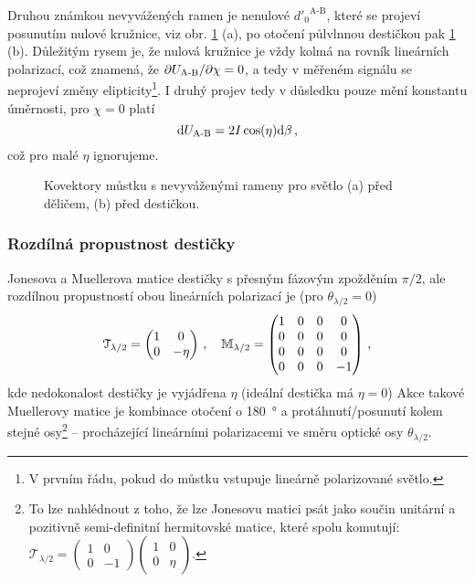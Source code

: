 Druhou známkou nevyvážených ramen je nenulové  ${d'_0}^\textrm{A-B}$, které se projeví posunutím nulové kružnice, viz obr. \ref{fig:mustek-nedokonale-ramena} (a), po otočení půlvlnnou destičkou pak \ref{fig:mustek-nedokonale-ramena} (b).
Důležitým rysem je, že nulová kružnice je vždy kolmá na rovník lineárních polarizací, což znamená, že $\partial U_\textrm{A-B}/\partial\chi = 0$, a tedy v měřeném signálu se neprojeví změny elipticity\footnote{V prvním řádu, pokud do můstku vstupuje lineárně polarizované světlo.}.
I druhý projev tedy v důsledku pouze mění konstantu úměrnosti, pro $\chi=0$ platí
\begin{equation}
    \textrm{d}U_\textrm{A-B} = 2I\cos(\eta) \textrm{d}\beta \,,
\end{equation}
což pro malé $\eta$ ignorujeme.

\begin{figure}[htbp]
    \centering
    \caption{Kovektory můstku s nevyváženými rameny pro světlo (a) před děličem, (b) před destičkou.}
    \label{fig:mustek-nedokonale-ramena}
\end{figure}

\subsubsection*{Rozdílná propustnost destičky}
Jonesova a Muellerova matice destičky s přesným fázovým zpožděním $\pi/2$, ale rozdílnou propustností obou lineárních polarizací je (pro $\theta_{\lambda/2}=0$)
\begin{equation}
    \mathcal{T}_{\lambda/2} = \begin{pmatrix} 1&0 \\ 0&-\eta \end{pmatrix} \,, \quad
    \mathbb{M}_{\lambda/2} = \begin{pmatrix} 1&0&0&0 \\ 0&0&0&0 \\ 0&0&0&0 \\ 0&0&0&-1 \end{pmatrix} \,,
\end{equation}
kde nedokonalost destičky je vyjádřena $\eta$ (ideální destička má $\eta=0$)
Akce takové Muellerovy matice je kombinace otočení o \SI{180}{\degree} a protáhnutí/posunutí kolem stejné osy\footnote{To lze nahlédnout z toho, že lze Jonesovu matici psát jako součin unitární a pozitivně semi-definitní hermitovské matice, které spolu komutují: $\mathcal{T}_{\lambda/2} = \begin{pmatrix} 1&0\\0&-1 \end{pmatrix} \begin{pmatrix} 1&0\\0&\eta \end{pmatrix}$.} -- procházející lineárními polarizacemi ve směru optické osy $\theta_{\lambda/2}$.

